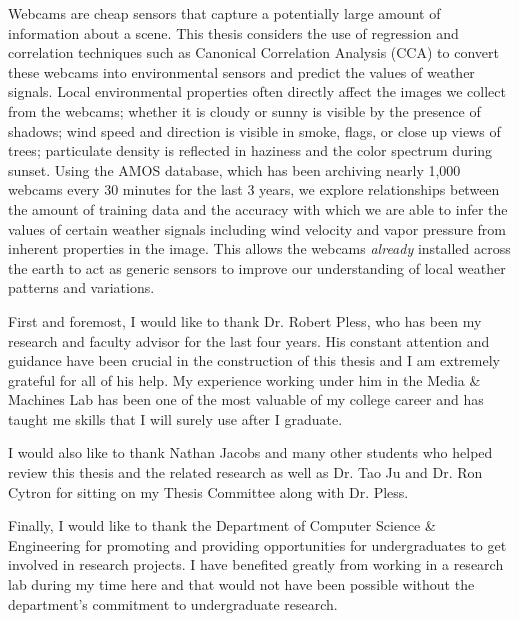 \begin{thesistitlepage}               %
\end{thesistitlepage}


\begin{thesisabstract}
Webcams are cheap sensors that capture a potentially large amount of information about a scene. This thesis considers the use of regression and correlation techniques such as Canonical Correlation Analysis (CCA) to convert these webcams into environmental sensors and predict the values of weather signals. Local environmental properties often directly affect the images we collect from the webcams; whether it is cloudy or sunny is visible by the presence of shadows; wind speed and direction is visible in smoke, flags, or close up views of trees; particulate density is reflected in haziness and the color spectrum during sunset. Using the AMOS database, which has been archiving nearly 1,000 webcams every 30 minutes for the last 3 years, we explore relationships between the amount of training data and the accuracy with which we are able to infer the values of certain weather signals including wind velocity and vapor pressure from inherent properties in the image. This allows the webcams \textit{already} installed across the earth to act as generic sensors to improve our understanding of local weather patterns and variations.
\end{thesisabstract}

\begin{thesisacknowledgments}
First and foremost, I would like to thank Dr. Robert Pless, who has been my research and faculty advisor for the last four years. His constant attention and guidance have been crucial in the construction of this thesis and I am extremely grateful for all of his help. My experience working under him in the Media \& Machines Lab has been one of the most valuable of my college career and has taught me skills that I will surely use after I graduate.

I would also like to thank Nathan Jacobs and many other students who helped review this thesis and the related research as well as Dr. Tao Ju and Dr. Ron Cytron for sitting on my Thesis Committee along with Dr. Pless.

Finally, I would like to thank the Department of Computer Science \& Engineering for promoting and providing opportunities for undergraduates to get involved in research projects. I have benefited greatly from working in a research lab during my time here and that would not have been possible without the department's commitment to undergraduate research.
\end{thesisacknowledgments}

\begin{singlespace}
\tableofcontents
\listoffigures
\end{singlespace}